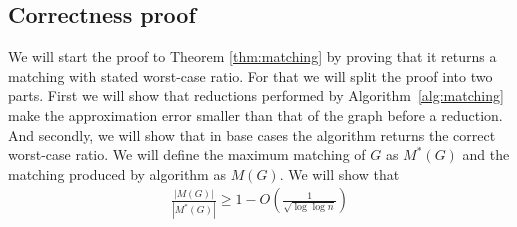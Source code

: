 \subsection{Correctness proof}
We will start the proof to Theorem \ref{thm:matching} by proving that it returns
a matching with stated worst-case ratio. For that we will split the proof into
two parts. First we will show that reductions performed by Algorithm~\ref{alg:matching}
make the approximation error smaller than that of the graph before a reduction.
And secondly, we will show that in base cases the algorithm returns the correct
worst-case ratio. We will define the maximum matching of $G$ as $M^*(G)$ and the
matching produced by algorithm as $M(G)$. We will show that
\begin{align*}
    \frac{|M(G)|}{|M^*(G)|} \geq 1 - O\left( \frac{1}{\sqrt{\log\log n}} \right)
\end{align*}

